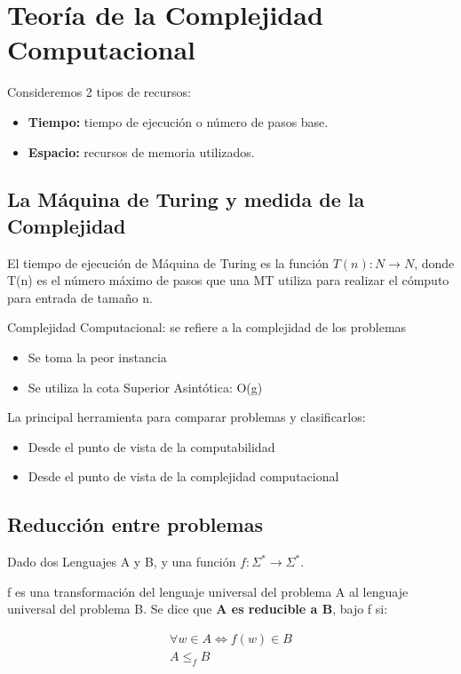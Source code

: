 \chapter{Teoría de la Complejidad Computacional}\label{ch:teoría-de-la-complejidad-computacional}
Consideremos 2 tipos de recursos:
\begin{itemize}
  \item \textbf{Tiempo:} tiempo de ejecución o número de pasos base.
  \item \textbf{Espacio:} recursos de memoria utilizados.
\end{itemize}

\section{La Máquina de Turing y medida de la Complejidad}
El tiempo de ejecución de Máquina de Turing es la función $T(n): N \rightarrow N$, donde T(n) es el número máximo de pasos que una MT utiliza para realizar el cómputo para entrada de tamaño n.

Complejidad Computacional: se refiere a la complejidad de los problemas
\begin{itemize}
  \item Se toma la peor instancia
  \item Se utiliza la cota Superior  Asintótica: O(g)
\end{itemize}

La principal herramienta para comparar problemas y clasificarlos:
\begin{itemize}
  \item Desde el punto de vista de la computabilidad
  \item Desde el punto de vista de la complejidad computacional
\end{itemize} 

\section{Reducción entre problemas}
Dado dos Lenguajes A y B, y una función $f: \Sigma^* \rightarrow \Sigma^*$.

f es una transformación del lenguaje universal del problema A al lenguaje universal del problema B. Se dice que \textbf{A es reducible a B}, bajo f si:

$$\begin{matrix}
  \forall w \in A \Leftrightarrow f(w)\in B \\ 
  A \leq_f B
\end{matrix}$$

